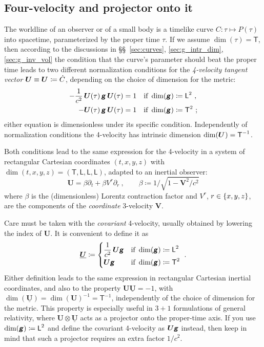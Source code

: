 \documentclass[\ifafour a4paper,12pt,\else a5paper,10pt,\fi%
onecolumn,oneside,article,%
british%
]{memoir}
\makeatletter
\theoremstyle{remark}
\theoremstyle{innote}
\newcommand*{\mathte}[1]{\textbf{\textit{\textsf{#1}}}}
\newcommand*{\de}{\partialup}%
\newcommand*{\defd}{\coloneqq}
\DeclarePairedDelimiter\set{\{}{\}}
\renewcommand*{\|}[1][]{\nonscript\,#1\vert\nonscript\;\mathopen{}}
\newcommand*{\sects}{\S\S}%
\newcommand*{\q}{}%
\DeclareRobustCommand*{\q}{%
  \mathord{\mathpalette\bigcdot@{}}%
}
\newcommand*{\bigcdot@scalefactor}{0.7}
\newcommand*{\bigcdot@widthfactor}{1.5}
\newcommand*{\bigcdot@}[2]{%
  \sbox0{$#1\vcenter{}$}%
  \sbox2{$#1\cdot\m@th$}%
  \hbox to \bigcdot@widthfactor\wd2{%
    \hfil
    \raise\ht0\hbox{%
      \scalebox{\bigcdot@scalefactor}{%
        \lower\ht0\hbox{$#1\bullet\m@th$}%
      }%
    }%
    \hfil
  }%
}
\newcommand*{\Le}{\textsf{L}}
\newcommand*{\Ti}{\textsf{T}}
\newcommand*{\yg}{\mathte{g}}
\renewcommand*{\i}{\indices}
\newcommand*{\yC}{\dot{C}}
\newcommand*{\yU}{\bm{U}}
\newcommand*{\yUu}{\underline{\yU}}
\newcommand*{\ytp}{\tau}
\newcommand*{\yl}{\beta}
\newcommand*{\yV}{\bm{V}}
\makeatother
\begin{document}
\subsection{Four-velocity and projector onto it}
\label{sec:g_4velocity}

The worldline of an observer or of a small body is a timelike curve
$C\colon \ytp \mapsto P(\ytp)$ into spacetime, parameterized by the proper
time $\ytp$. If we assume $\dim(\ytp)=\Ti$, then according to the
discussions in \sects~\ref{sec:curves}, \ref{sec:g_intr_dim},
\ref{sec:g_inv_vol} the condition that the curve's parameter should beat
the proper time leads to two different normalization conditions for the
\emph{4-velocity tangent vector} $\yU \equiv \yU\i{^{\q}} \defd \yC$,
depending on the choice of dimension for the metric:
\begin{equation}
  \label{eq:proper_time_condition}
  \begin{aligned}
   - \frac{1}{c^{2}}\, \yU(\tau)\,\yg\,\yU(\tau) &= 1
    &&\text{if }\dim(\yg) \defd \Le^{2} \ ,
      \\
    -\yU(\tau)\,\yg\,\yU(\tau) &= 1
    &&\text{if }\dim(\yg) \defd \Ti^{2} \ ;
  \end{aligned}
\end{equation}
either equation is dimensionless under its specific condition.
Independently of normalization conditions the 4-velocity has intrinsic
dimension $\dim(\yU\i{^{\q}}) = \Ti^{-1}$.

Both conditions lead to the same expression for the 4-velocity in a system
of rectangular Cartesian coordinates $(t,x,y,z)$ with
$\dim(t,x,y,z) = (\Ti,\Le,\Le,\Le)$, adapted to an inertial observer:
\begin{equation}
  \label{eq:4-velocity_coords}
  \yU  = \yl \de_{t} + \yl V^{r} \de_{r} \ ,
  \qquad  \yl \defd 1/\sqrt{1- \yV^{2}/c^{2}}
\end{equation}
where $\yl$ is the (dimensionless) Lorentz contraction factor and $V^{r}$,
$r \in \set{x,y,z}$, are the components of the \emph{coordinate} 3-velocity
$\yV$.

Care must be taken with the \emph{covariant} 4-velocity, usually obtained
by lowering the index of $\yU$. It is convenient to define it as
\begin{equation}
  \label{eq:covariant_4velocity}
  \yUu \defd
  \begin{cases}
    \dfrac{1}{c^{2}}\,\yU \yg & \text{if }\dim(\yg)\defd \Le^{2}
    \\[\jot]
    \yU \yg & \text{if }\dim(\yg)\defd \Ti^{2}
  \end{cases} \ .
\end{equation}
Either definition leads to the same expression in rectangular Cartesian
inertial coordinates, and also to the property $\yU\yUu = -1$, with
$\dim(\yUu) = \dim(\yU)^{-1} = \Ti^{-1}$, independently of the choice of
dimension for the metric. This property is especially useful in $3+1$
formulations of general relativity, where $\yU \otimes \yUu$ acts as a
projector onto the proper-time axis. If you use $\dim(\yg)\defd\Le^{2}$ and
define the covariant 4-velocity as $\yU\yg$ instead, then keep in mind that
such a projector requires an extra factor $1/c^{2}$.
\end{document}
